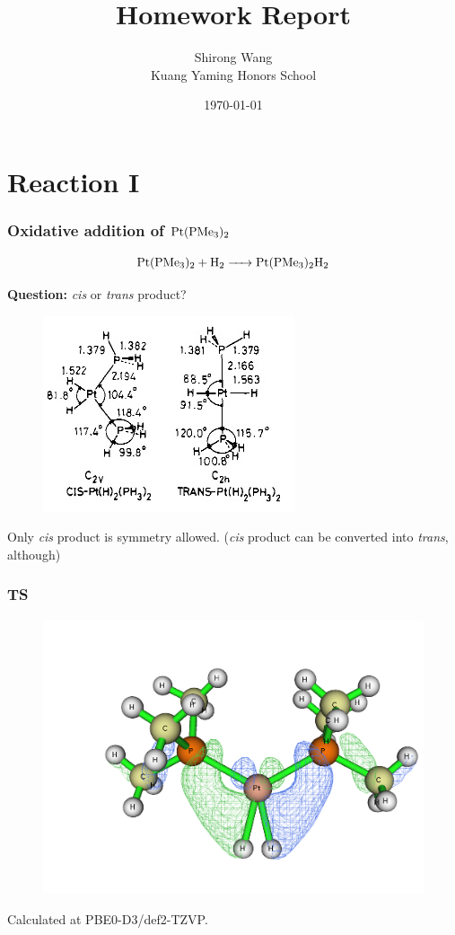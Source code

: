 \documentclass[10pt,aspectratio=43,mathserif]{beamer}
\title{Homework Report}	        %
\author[]{            %
    Shirong Wang\\[0.3cm]
    Kuang Yaming Honors School}
\date{\today}
\begin{document}
\begin{frame}
\titlepage
\end{frame}


\section{Reaction I}
\begin{frame}
\frametitle{Oxidative addition of $ \ce{Pt(PMe_3)_2} $}
\begin{equation}\label{key}
\ce{Pt(PMe_3)_2 + H_2 -> Pt(PMe_3)_2H_2}
\end{equation}

\end{frame}

\begin{frame}
\textbf{Question:} \textsl{cis} or \textsl{trans} product?\\

\begin{figure}[H]
	\includegraphics[width=0.45\linewidth]{Pt1.jpg}
\end{figure}
Only \textsl{cis} product is symmetry allowed. (\textsl{cis} product can be converted into \textsl{trans}, although)\\

\end{frame}

\begin{frame}
\frametitle{TS}
\begin{figure}
	\includegraphics[width=0.45\linewidth]{Pt_tsb_orb.png}
\end{figure}
Calculated at PBE0-D3/def2-TZVP.
\end{frame}
\end{document}
